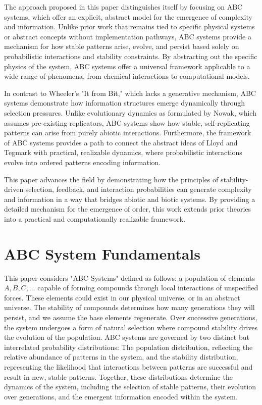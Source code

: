 \documentclass[entropy,article,submit,pdftex,moreauthors]{Definitions/mdpi}
\begin{document}
The approach proposed in this paper distinguishes itself by focusing on ABC systems, which offer an explicit, abstract model for the emergence of complexity and information. Unlike prior work that remains tied to specific physical systems or abstract concepts without implementation pathways, ABC systems provide a mechanism for how stable patterns arise, evolve, and persist based solely on probabilistic interactions and stability constraints. By abstracting out the specific physics of the system, ABC systems offer a universal framework applicable to a wide range of phenomena, from chemical interactions to computational models.

In contrast to Wheeler’s "It from Bit," which lacks a generative mechanism, ABC systems demonstrate how information structures emerge dynamically through selection pressures. Unlike evolutionary dynamics as formulated by Nowak, which assumes pre-existing replicators, ABC systems show how stable, self-replicating patterns can arise from purely abiotic interactions. Furthermore, the framework of ABC systems provides a path to connect the abstract ideas of Lloyd and Tegmark with practical, realizable dynamics, where probabilistic interactions evolve into ordered patterns encoding information.

This paper advances the field by demonstrating how the principles of stability-driven selection, feedback, and interaction probabilities can generate complexity and information in a way that bridges abiotic and biotic systems. By providing a detailed mechanism for the emergence of order, this work extends prior theories into a practical and computationally realizable framework.


\section{ABC System Fundamentals}

This paper considers "ABC Systems" defined as follows: a population of elements \( A, B, C, \dots \) capable of forming compounds through local interactions of unspecified forces. These elements could exist in our physical universe, or in an abstract universe. The stability of compounds determines how many generations they will persist, and we assume the base elements regenerate. Over successive generations, the system undergoes a form of natural selection where compound stability drives the evolution of the population. ABC systems are governed by two distinct but interrelated probability distributions: The population distribution, reflecting the relative abundance of patterns in the system, and the stability distribution, representing the likelihood that interactions between patterns are successful and result in new, stable patterns. Together, these distributions determine the dynamics of the system, including the selection of stable patterns, their evolution over generations, and the emergent information encoded within the system.
\end{document}
